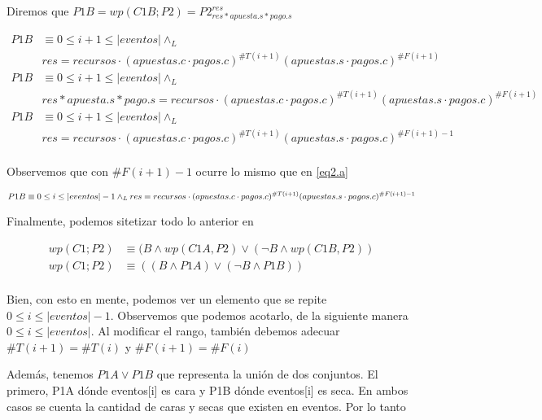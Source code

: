 \documentclass[../document.tex]{subfiles}
\begin{document}
Diremos que $P1B = wp(C1B;P2) = P2^{res}_{res * apuesta.s * pago.s}$

\begin{equation} \label{eq2.b}
\begin{split}
P1B & \equiv 0\leq i+1 \leq |eventos| \land_L \\& res = recursos \cdot (apuestas.c\cdot pagos.c)^{\#T(i+1)}(apuestas.s\cdot pagos.c)^{\#F(i+1)}\\
P1B & \equiv 0\leq i+1 \leq |eventos| \land_L \\& res * apuesta.s * pago.s = recursos \cdot (apuestas.c\cdot pagos.c)^{\#T(i+1)}(apuestas.s\cdot pagos.c)^{\#F(i+1)}\\
P1B & \equiv 0\leq i+1 \leq |eventos| \land_L \\& res = recursos \cdot (apuestas.c\cdot pagos.c)^{\#T(i+1)}(apuestas.s\cdot pagos.c)^{\#F(i+1)-1}\\
\end{split}
\end{equation}

Observemos que con $\#F(i+1)-1$ ocurre lo mismo que en \ref{eq2.a}

\begin{equation} \label{P1A}
    P1B \equiv 0\leq i \leq |eventos|-1 \land_L \\ res = recursos \cdot (apuestas.c\cdot pagos.c)^{\#T(i+1)}(apuestas.s\cdot pagos.c)^{\#F(i+1)-1}\\
\end{equation}

Finalmente, podemos sitetizar todo lo anterior en

\begin{equation} \label{final}
\begin{split}
    wp(C1;P2) &\equiv (B \land wp(C1A, P2) \lor (\neg B \land wp(C1B, P2))\\
    wp(C1;P2) &\equiv ((B \land P1A) \lor (\neg B \land P1B))\\
\end{split}
\end{equation}

Bien, con esto en mente, podemos ver un elemento que se repite \\$0\leq i \leq |eventos|-1$. Observemos que podemos acotarlo, de la siguiente manera\\
$0\leq i \leq |eventos|$. Al modificar el rango, también debemos adecuar $\#T(i+1)=\#T(i)$ y $\#F(i+1)=\#F(i)$

Además, tenemos $P1A \lor P1B$ que representa la unión de dos conjuntos. El primero, P1A dónde eventos[i] es cara y P1B dónde eventos[i] es seca. En ambos casos se cuenta la cantidad de caras y secas que existen en eventos. Por lo tanto
\end{document}
